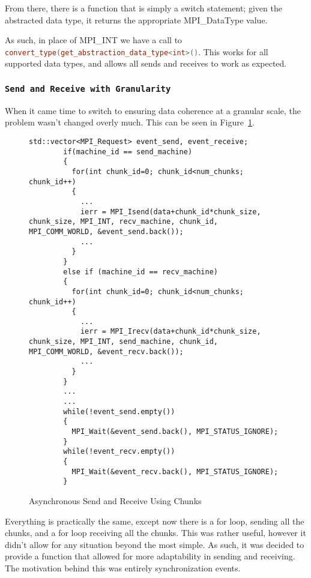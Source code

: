\documentclass[thesis.tex]{subfiles}
\begin{document}
    From there, there is a function that is simply a switch statement; given the abstracted data type, it returns the appropriate MPI\_DataType value.

    As such, in place of MPI\_INT we have a call to 
    \lstinline[language=cpp]{convert_type(get_abstraction_data_type<int>()}. This works for all supported data types, and allows all sends and receives to work as expected.

  \subsubsection{\texttt{Send and Receive with Granularity}} %
  \label{ssub:send_and_receive_with_granularity}
  
    When it came time to switch to ensuring data coherence at a granular scale, the problem wasn't changed overly much. This can be seen in Figure~\ref{fig:async_send_recv_using_chunks}.

    \begin{figure}[htbp]
      \centering

      \lstset{language=cpp}  
      \begin{lstlisting}[tabsize=2]
        std::vector<MPI_Request> event_send, event_receive;
        if(machine_id == send_machine)
        {
          for(int chunk_id=0; chunk_id<num_chunks; chunk_id++)
          {
            ...
            ierr = MPI_Isend(data+chunk_id*chunk_size, chunk_size, MPI_INT, recv_machine, chunk_id, MPI_COMM_WORLD, &event_send.back());
            ...
          }
        }
        else if (machine_id == recv_machine)
        {
          for(int chunk_id=0; chunk_id<num_chunks; chunk_id++)
          {
            ...
            ierr = MPI_Irecv(data+chunk_id*chunk_size, chunk_size, MPI_INT, send_machine, chunk_id, MPI_COMM_WORLD, &event_recv.back());
            ...
          }
        }
        ...
        ...
        while(!event_send.empty())
        {
          MPI_Wait(&event_send.back(), MPI_STATUS_IGNORE);
        }
        while(!event_recv.empty())
        {
          MPI_Wait(&event_recv.back(), MPI_STATUS_IGNORE);
        }

        \end{lstlisting}

      \caption{Asynchronous Send and Receive Using Chunks}
      \label{fig:async_send_recv_using_chunks}
    \end{figure}

    Everything is practically the same, except now there is a for loop, sending all the chunks, and a for loop receiving all the chunks. This was rather useful, however it didn't allow for any situation beyond the most simple. As such, it was decided to provide a function that allowed for more adaptability in sending and receiving. The motivation behind this was entirely synchronization events.
\end{document}
